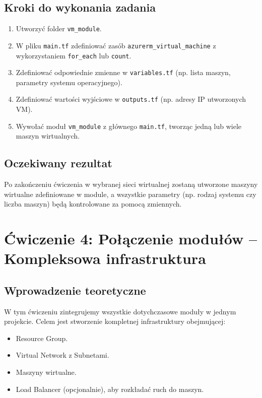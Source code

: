 \documentclass{article}
\begin{document}
\subsection{Kroki do wykonania zadania}
\begin{enumerate}
    \item Utworzyć folder \texttt{vm\_module}.
    \item W pliku \texttt{main.tf} zdefiniować zasób \texttt{azurerm\_virtual\_machine} z wykorzystaniem \texttt{for\_each} lub \texttt{count}.
    \item Zdefiniować odpowiednie zmienne w \texttt{variables.tf} (np. lista maszyn, parametry systemu operacyjnego).
    \item Zdefiniować wartości wyjściowe w \texttt{outputs.tf} (np. adresy IP utworzonych VM).
    \item Wywołać moduł \texttt{vm\_module} z głównego \texttt{main.tf}, tworząc jedną lub wiele maszyn wirtualnych.
\end{enumerate}

\subsection{Oczekiwany rezultat}
Po zakończeniu ćwiczenia w wybranej sieci wirtualnej zostaną utworzone maszyny wirtualne zdefiniowane w module, a wszystkie parametry (np. rodzaj systemu czy liczba maszyn) będą kontrolowane za pomocą zmiennych.

\section{Ćwiczenie 4: Połączenie modułów – Kompleksowa infrastruktura}

\subsection{Wprowadzenie teoretyczne}
W tym ćwiczeniu zintegrujemy wszystkie dotychczasowe moduły w jednym projekcie. Celem jest stworzenie kompletnej infrastruktury obejmującej:
\begin{itemize}
    \item Resource Group.
    \item Virtual Network z Subnetami.
    \item Maszyny wirtualne.
    \item Load Balancer (opcjonalnie), aby rozkładać ruch do maszyn.
\end{itemize}
\end{document}
